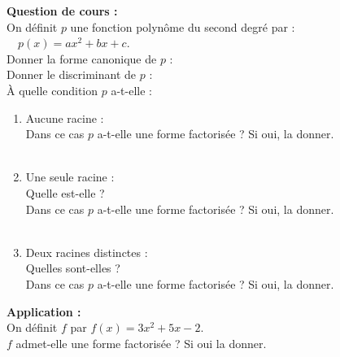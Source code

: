 \documentclass[a4paper,11pt,french]{article}
\begin{document}

\textbf{Question de cours :}\\

On définit $p$ une fonction polynôme du second degré par : $\quad p(x)=ax^2+bx+c$.\\[.5em]
Donner la forme canonique de $p$ : \dotfill\\[.5em]
Donner le discriminant de $p$ : \dotfill\\

À quelle condition $p$ a-t-elle :
\begin{enumerate}[\textbullet]
	\item 	Aucune racine : \dotfill \\[.5em]
			Dans ce cas $p$ a-t-elle une forme factorisée ? Si oui, la donner.\\[.5em]
			\\
			
	\item 	Une seule racine : \dotfill\\[.5em]
			Quelle est-elle ? \dotfill\\[.5em]
			Dans ce cas $p$ a-t-elle une forme factorisée ? Si oui, la donner.\\[.5em]
			\\
			
	\item	Deux racines distinctes : \dotfill\\[.5em]
			Quelles sont-elles ? \dotfill\\[.5em]
			Dans ce cas $p$ a-t-elle une forme factorisée ? Si oui, la donner.\\[.5em]
\end{enumerate}

\newpage
\textbf{Application :}\\

On définit $f$ par $f(x)=3x^2+5x-2$.\\
$f$ admet-elle une forme factorisée ? Si oui la donner.\\

\end{document}

